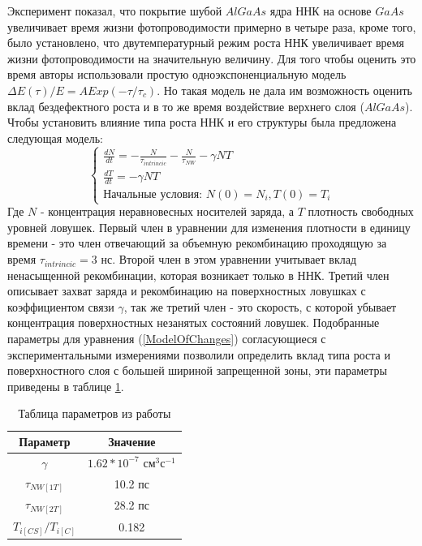 \documentclass[a4paper,14pt,russian]{extreport}
\begin{document}
				Эксперимент показал, что покрытие шубой $AlGaAs$ ядра ННК на основе $GaAs$ увеличивает время жизни фотопроводимости примерно в четыре раза, кроме того, было установлено, что двутемпературный режим роста ННК увеличивает время жизни фотопроводимости на значительную величину. Для того чтобы оценить это время авторы использовали простую одноэкспоненциальную модель $\Delta E(\tau)/E = A Exp(-\tau/\tau_c)$. Но такая модель не дала им возможность оценить вклад бездефектного роста и в то же время воздействие верхнего слоя ($AlGaAs$). Чтобы установить влияние типа роста ННК и его структуры была предложена следующая модель:
				\begin{equation}\label{ModelOfChanges}
					\begin{cases}
   					\frac{dN}{dt} = -\frac{N}{\tau_{intrincic}} - \frac{N}{\tau_{NW}} - \gamma NT \\
					\frac{dT}{dt} = - \gamma NT \\
					\text{Начальные условия: } N(0) = N_i, T(0) = T_i
 					\end{cases}
				\end{equation}
				Где $N$ - концентрация неравновесных носителей заряда, а $T$ плотность свободных уровней ловушек. Первый член в уравнении для изменения плотности в единицу времени - это член отвечающий за объемную рекомбинацию проходящую за время $\tau_{intrincic} = 3 \text{ нс}$. Второй член в этом уравнении учитывает вклад ненасыщенной рекомбинации, которая возникает только в ННК. Третий член описывает захват заряда и рекомбинацию на поверхностных ловушках с коэффициентом связи $\gamma$, так же третий член - это скорость, с которой убывает концентрация поверхностных незанятых состояний ловушек. Подобранные параметры для уравнения (\ref{ModelOfChanges}) согласующиеся с экспериментальными измерениями позволили определить вклад типа роста и поверхностного слоя с большей шириной запрещенной зоны, эти параметры приведены в таблице \ref{CoefficientsFromModelOfChanges}.
\begin{table}[h]
\centering
\caption{Таблица параметров из работы \cite{CurrentLifetime}}
\label{CoefficientsFromModelOfChanges}
\begin{tabular}{@{}cc@{}}
\toprule
Параметр                         & Значение                          \\ \midrule
$\gamma$                           & $1.62 *10^{-7}$ $\text{см}^3\text{с}^{-1}$ \\
$\tau_{NW[1T]}$             & 10.2 пс                           \\
$\tau_{NW[2T]}$             & 28.2 пс                           \\
$T_{i[CS]}/T_{i[C]}$				   & 0.182                             \\ \bottomrule
\end{tabular}
\end{table}
\end{document}
